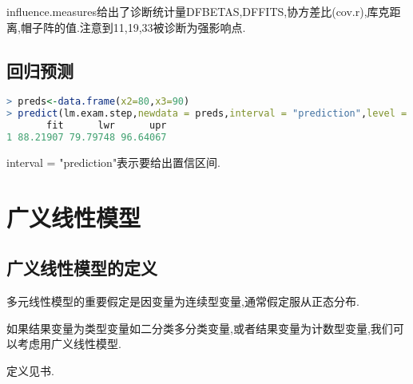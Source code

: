 \documentclass[11pt,a4paper,oneside]{book}
\begin{document}
influence.measures给出了诊断统计量DFBETAS,DFFITS,协方差比(cov.r),库克距离,帽子阵的值.注意到11,19,33被诊断为强影响点.

\section{回归预测}
\begin{lstlisting}[language=r]
> preds<-data.frame(x2=80,x3=90)
> predict(lm.exam.step,newdata = preds,interval = "prediction",level = 0.95)
       fit      lwr      upr
1 88.21907 79.79748 96.64067
\end{lstlisting}
interval = "prediction"表示要给出置信区间.
\chapter{广义线性模型}
\section{广义线性模型的定义}
多元线性模型的重要假定是因变量为连续型变量,通常假定服从正态分布.

如果结果变量为类型变量如二分类多分类变量,或者结果变量为计数型变量,我们可以考虑用广义线性模型.

定义见书.
\end{document}
